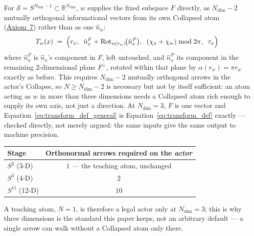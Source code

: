 \documentclass[12pt, a4paper]{article}
\begin{document}
For $\mathcal{S}=S^{N_{\mathrm{dim}}-1}\subset\mathbb{R}^{N_{\mathrm{dim}}}$,
$w$ supplies the fixed subspace $F$ directly, as $N_{\mathrm{dim}}-2$
mutually orthogonal informational vectors from its own Collapsed atom
(\hyperref[subsec:axiom_v1_metrics]{Axiom~7}) rather than as one $\hat n_w$:
\begin{equation}
    T_w(x)
    \;=\;
    \Bigl(
        r_x,\;\;
        \hat n_x^F + \mathrm{Rot}_{\alpha(r_w)}\!\bigl(\hat n_x^P\bigr),\;\;
        (\chi_x + \chi_w) \bmod 2\pi,\;\;
        \tau_x
    \Bigr)
    \label{eq:transform_def_general}
\end{equation}
where $\hat n_x^F$ is $\hat n_x$'s component in $F$, left untouched,
and $\hat n_x^P$ its component in the remaining $2$-dimensional plane
$F^\perp$, rotated within that plane by $\alpha(r_w)=\pi r_w$ exactly
as before. This requires $N_{\mathrm{dim}}-2$ mutually orthogonal
arrows in the actor's Collapse, so $N\ge N_{\mathrm{dim}}-2$ is
necessary but not by itself sufficient: an atom acting as
$w$ in more than three dimensions needs a Collapsed atom rich enough to
supply its own axis, not just a direction. At $N_{\mathrm{dim}}=3$,
$F$ is one vector and Equation~\eqref{eq:transform_def_general} is
Equation~\eqref{eq:transform_def} exactly --- checked directly, not
merely argued: the same inputs give the same output to machine
precision.

\begin{center}
\begin{tabular}{lc}
Stage & Orthonormal arrows required on the \emph{actor} \\
\hline
$S^2$ (3-D) & $1$ --- the teaching atom, unchanged \\
$S^3$ (4-D) & $2$ \\
$S^{11}$ (12-D) & $10$ \\
\end{tabular}
\end{center}
A teaching atom, $N=1$, is therefore a legal actor only at
$N_{\mathrm{dim}}=3$; this is why three dimensions is the standard
this paper keeps, not an arbitrary default --- a single arrow can
walk without a Collapsed atom only there.
\end{document}
